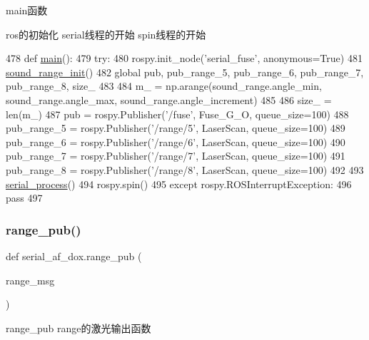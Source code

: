 main函数 

ros的初始化 serial线程的开始 spin线程的开始 
\begin{DoxyCode}
478 \textcolor{keyword}{def }\hyperlink{namespaceserial__af__dox_af39f958509555b34b2cb0bea98981418}{main}():
479     \textcolor{keywordflow}{try}:
480         rospy.init\_node(\textcolor{stringliteral}{'serial\_fuse'}, anonymous=\textcolor{keyword}{True})
481         \hyperlink{namespaceserial__af__dox_ad1c876b11fde1e1df850b6ee76536042}{sound\_range\_init}()
482         \textcolor{keyword}{global} pub, pub\_range\_5, pub\_range\_6, pub\_range\_7, pub\_range\_8, size\_
483         
484         m\_ = np.arange(sound\_range.angle\_min, sound\_range.angle\_max, sound\_range.angle\_increment)
485         
486         size\_ = len(m\_)
487         pub = rospy.Publisher(\textcolor{stringliteral}{'/fuse'}, Fuse\_G\_O, queue\_size=100)
488         pub\_range\_5 = rospy.Publisher(\textcolor{stringliteral}{'/range/5'}, LaserScan, queue\_size=100)
489         pub\_range\_6 = rospy.Publisher(\textcolor{stringliteral}{'/range/6'}, LaserScan, queue\_size=100)
490         pub\_range\_7 = rospy.Publisher(\textcolor{stringliteral}{'/range/7'}, LaserScan, queue\_size=100)
491         pub\_range\_8 = rospy.Publisher(\textcolor{stringliteral}{'/range/8'}, LaserScan, queue\_size=100)
492 
493         \hyperlink{namespaceserial__af__dox_a88369fbec8f4073e79e32dc236e5e282}{serial\_process}()
494         rospy.spin()
495     \textcolor{keywordflow}{except} rospy.ROSInterruptException:
496         \textcolor{keywordflow}{pass}
497 
\end{DoxyCode}
\mbox{\label{namespaceserial__af__dox_a8431825ba6486f7d2e0ddfda61a4ae5d}} 
\subsubsection{\texorpdfstring{range\+\_\+pub()}{range\_pub()}}
{\footnotesize\ttfamily def serial\+\_\+af\+\_\+dox.\+range\+\_\+pub (\begin{DoxyParamCaption}\item[{}]{range\+\_\+msg }\end{DoxyParamCaption})}



range\+\_\+pub range的激光输出函数 

